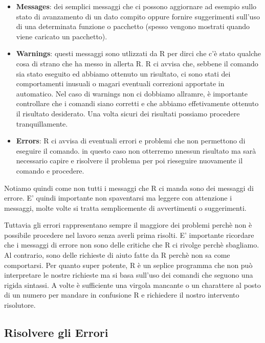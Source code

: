 \documentclass[
]{book}
\providecommand{\tightlist}{%
  \setlength{\itemsep}{0pt}\setlength{\parskip}{0pt}}
\begin{document}
\begin{itemize}
\tightlist
\item
  \textbf{Messages}: dei semplici messaggi che ci possono aggiornare ad esempio sullo stato di avanzamento di un dato compito oppure fornire suggerimenti sull'uso di una determinata funzione o pacchetto (spesso vengono mostrati quando viene caricato un pacchetto).
\item
  \textbf{Warnings}: questi messaggi sono utlizzati da R per dirci che c'è stato qualche cosa di strano che ha messo in allerta R. R ci avvisa che, sebbene il comando sia stato eseguito ed abbiamo ottenuto un risultato, ci sono stati dei comportamenti inusuali o magari eventuali correzioni apportate in automatico. Nel caso di warnings non ci dobbiamo allramre, è importante controllare che i comandi siano corretti e che abbiamo effetivamente ottenuto il risultato desiderato. Una volta sicuri dei risultati possiamo procedere tranquillamente.
\item
  \textbf{Errors}: R ci avvisa di eventuali errori e problemi che non permettono di eseguire il comando. in questo caso non otterremo nnessun risultato ma sarà necessario capire e risolvere il problema per poi rieseguire nuovamente il comando e procedere.
\end{itemize}

Notiamo quindi come non tutti i messaggi che R ci manda sono dei messaggi di errore. E' quindi importante non spaventarsi ma leggere con attenzione i messaggi, molte volte si tratta semplicemente di avvertimenti o suggerimenti.

Tuttavia gli errori rappresentano sempre il maggiore dei problemi perchè non è possibile procedere nel lavoro senza averli prima risolti. E' importante ricordare che i messaggi di errore non sono delle critiche che R ci rivolge perchè sbagliamo. Al contrario, sono delle richieste di aiuto fatte da R perchè non sa come comportarsi. Per quanto super potente, R è un seplice programma che non può interpretare le nostre richieste ma si basa sull'uso dei comandi che seguono una rigida sintassi. A volte è sufficiente una virgola mancante o un charattere al posto di un numero per mandare in confusione R e richiedere il nostro intervento risolutore.

\hypertarget{risolvere-gli-errori}{%
\subsection{Risolvere gli Errori}\label{risolvere-gli-errori}}
\end{document}
